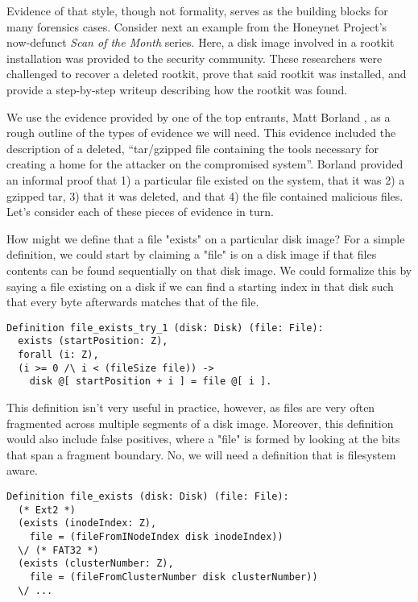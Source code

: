 \documentclass[nocopyrightspace]{sigplanconf}
\begin{document}
Evidence of that style, though not formality, serves as the building blocks
for many forensics cases. Consider next an example \cite{honeynet-15} from the
Honeynet Project's now-defunct {\it Scan of the Month} series. Here, a disk
image involved in a rootkit installation was provided to the security
community. These researchers were challenged to recover a deleted rootkit,
prove that said rootkit was installed, and provide a step-by-step writeup
describing how the rootkit was found.

We use the evidence provided by one of the top entrants, Matt Borland
\cite{borland-honeynet}, as a rough outline of the types of evidence we will
need. This evidence included the description of a deleted, ``tar/gzipped file
containing the tools necessary for creating a home for the attacker on the
compromised system''. Borland provided an informal proof that 1) a particular
file existed on the system, that it was 2) a gzipped tar, 3) that it was
deleted, and that 4) the file contained malicious files. Let's consider each
of these pieces of evidence in turn.

How might we define that a file "exists" on a particular disk image? For a
simple definition, we could start by claiming a "file" is on a disk image if
that files contents can be found sequentially on that disk image. We could
formalize this by saying a file existing on a disk if we can find a starting
index in that disk such that every byte afterwards matches that of the file.

\begin{lstlisting}
Definition file_exists_try_1 (disk: Disk) (file: File):
  exists (startPosition: Z),
  forall (i: Z),
  (i >= 0 /\ i < (fileSize file)) -> 
    disk @[ startPosition + i ] = file @[ i ].
\end{lstlisting}

This definition isn't very useful in practice, however, as files are very
often fragmented across multiple segments of a disk image. Moreover, this
definition would also include false positives, where a "file" is formed by
looking at the bits that span a fragment boundary. No, we will need a
definition that is filesystem aware.

\begin{lstlisting}
Definition file_exists (disk: Disk) (file: File):
  (* Ext2 *)
  (exists (inodeIndex: Z), 
    file = (fileFromINodeIndex disk inodeIndex))
  \/ (* FAT32 *)
  (exists (clusterNumber: Z), 
    file = (fileFromClusterNumber disk clusterNumber))
  \/ ...
\end{lstlisting}
\end{document}
